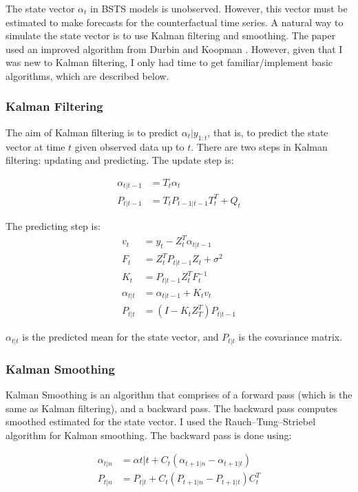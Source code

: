 \documentclass[12pt]{article}
\begin{document}
The state vector $\alpha_t$ in BSTS models is unobserved. However, this vector must be estimated to make forecasts for the counterfactual time series. A natural way to simulate the state vector is to use Kalman filtering and smoothing. The paper used an improved algorithm from Durbin and Koopman \cite{durbin2002simple}. However, given that I was new to Kalman filtering, I only had time to get familiar/implement basic algorithms, which are described below. \\

\subsubsection{Kalman Filtering}\label{kalman}
The aim of Kalman filtering is to predict $\alpha_{t}|y_{1:t}$, that is, to predict the state vector at time $t$ given observed data up to  $t$. There are two steps in Kalman filtering: updating and predicting. The update step is:

\begin{align*}
    \alpha_{t|t-1} &= T_t \alpha_t\\
    P_{t|t-1} &= T_t P_{t-1|t-1} T_t^T + Q_t
\end{align*}

The predicting step is:
\begin{align*}
    v_t &= y_t - Z_t^T \alpha_{t|t-1}\\
    F_t &= Z_t^T P_{t|t-1} Z_t + \sigma^2\\
    K_t &= P_{t|t-1} Z_t^T F_t^{-1}\\
    \alpha_{t|t} &= \alpha_{t|t-1} + K_t v_t\\
    P_{t|t} &= (I - K_t Z_T^T)P_{t|t-1}
\end{align*}

$ \alpha_{t|t}$ is the predicted mean for the state vector, and $P_{t|t}$ is the covariance matrix. 

\subsubsection{Kalman Smoothing}
Kalman Smoothing is an algorithm that comprises of a forward pass (which is the same as Kalman filtering), and a backward pass. The backward pass computes smoothed estimated for the state vector. I used the Rauch–Tung–Striebel algorithm for Kalman smoothing. The backward pass is done using:

\begin{align*}
    \alpha_{t|n} &= \alpha{t|t} + C_t(\alpha_{t+1|n} - \alpha_{t+1|t})\\
    P_{t|n} &= P_{t|t} + C_t(P_{t+1|n} - P_{t+1|t})C_t^T
\end{align*}
\end{document}

